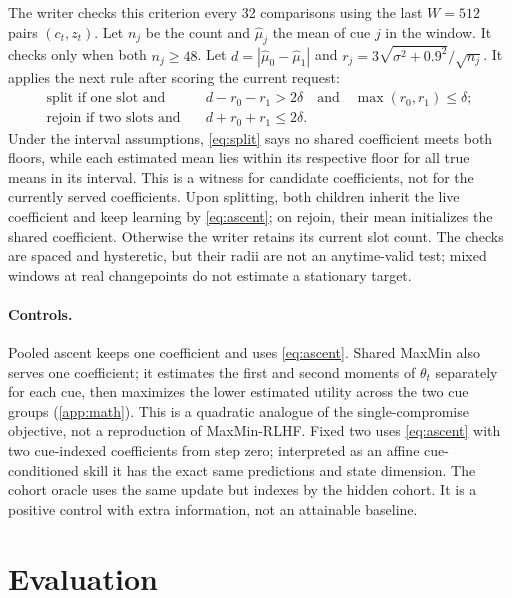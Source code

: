 \documentclass[11pt]{article}
\begin{document}
The writer checks this criterion every 32 comparisons using the last \(W=512\) pairs \((c_t,z_t)\). Let \(n_j\) be the count and \(\hat\mu_j\) the mean of cue \(j\) in the window. It checks only when both \(n_j\ge48\). Let \(d=|\hat\mu_0-\hat\mu_1|\) and \(r_j=3\sqrt{\sigma^2+0.9^2}/\sqrt{n_j}\). It applies the next rule after scoring the current request:
\begin{align}
 \text{split if one slot and}\quad
   & d-r_0-r_1>2\delta \quad\text{and}\quad \max(r_0,r_1)\le\delta ;
   \label{eq:split}\\
 \text{rejoin if two slots and}\quad
   & d+r_0+r_1\le 2\delta.
   \label{eq:rejoin}
\end{align}
Under the interval assumptions, \cref{eq:split} says no shared coefficient meets both floors, while each estimated mean lies within its respective floor for all true means in its interval. This is a witness for candidate coefficients, not for the currently served coefficients. Upon splitting, both children inherit the live coefficient and keep learning by \cref{eq:ascent}; on rejoin, their mean initializes the shared coefficient. Otherwise the writer retains its current slot count. The checks are spaced and hysteretic, but their radii are not an anytime-valid test; mixed windows at real changepoints do not estimate a stationary target.

\paragraph{Controls.}
Pooled ascent keeps one coefficient and uses \cref{eq:ascent}. Shared MaxMin also serves one coefficient; it estimates the first and second moments of \(\theta_t\) separately for each cue, then maximizes the lower estimated utility across the two cue groups (\cref{app:math}). This is a quadratic analogue of the single-compromise objective, not a reproduction of MaxMin-RLHF. Fixed two uses \cref{eq:ascent} with two cue-indexed coefficients from step zero; interpreted as an affine cue-conditioned skill it has the exact same predictions and state dimension. The cohort oracle uses the same update but indexes by the hidden cohort. It is a positive control with extra information, not an attainable baseline.

\section{Evaluation}
\label{sec:eval}
\end{document}
